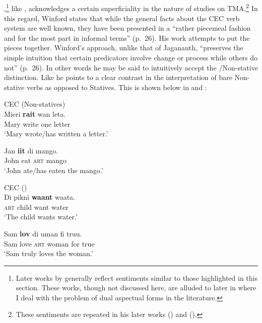 \subsection{\citet{Winford1993}}\label{sec:2.1.5}

\citet{Winford1993},\footnote{Later works by \citet{Winford1997,Winford2000}
generally reflect sentiments similar to those highlighted
  in this section. These works, though not discussed here, are alluded
  to later in  where I deal with the problem of dual
  aspectual forms in the literature.}  like \citet{Jaganauth1987}, acknowledges a
certain superficiality in the nature of studies on TMA.\footnote{These
  sentiments are repeated in his later works (\citeyear{Winford1997}) and (\citeyear{Winford2000}).}
  In this regard, Winford states that while the general facts about the CEC
verb system are well known, they have been presented in a ``rather
piecemeal fashion and for the most part in informal terms” (p.~26).
His work attempts to put the pieces together.  Winford’s approach,
unlike that of Jaganauth, ``preserves the simple intuition that certain
predicators involve change or process while others do not” (p.~26). In
other words he may be said to intuitively accept the
\slash Non-stative distinction.  Like \citet{Bickerton1975,Bickerton1981} he
points to a clear contrast in the interpretation of bare Non-stative
verbs as opposed to Statives. This is shown below in  and
 \citep[33]{Winford1993}:

\ea%
\label{ex:2:15}
CEC (Non-statives) \\
\ea
\gll Mieri \textbf{rait} wan leta.\\
		Mary write one letter\\
\glt `Mary wrote/has written a letter.'

\ex
\gll Jan \textbf{iit} di mango.\\
		John eat \textsc{art} mango\\
\glt `John ate/has eaten the mango.' \z \z

\ea%
\label{ex:2:16}
CEC ()\\
\ea
    \gll Di pikni \textbf{waant} waata.\\
\textsc{art} child        want water\\
\glt `The child wants water.'

\ex
\gll Sam \textbf{lov} di uman fi truu.\\
		Sam love \textsc{art} woman for true\\
\glt `Sam truly loves the woman.'  \z \z

